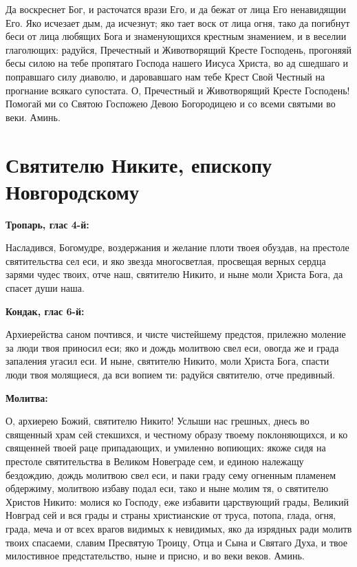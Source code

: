 Да воскреснет Бог, и расточатся врази Его, и да бежат от лица Его ненавидящии Его. Яко исчезает дым, да исчезнут; яко тает воск от лица огня, тако да погибнут беси от лица любящих Бога и знаменующихся крестным знамением, и в веселии глаголющих: радуйся, Пречестный и Животворящий Кресте Господень, прогоняяй бесы силою на тебе пропятаго Господа нашего Иисуса Христа, во ад сшедшаго и поправшаго силу диаволю, и даровавшаго нам тебе Крест Свой Честный на прогнание всякаго супостата. О, Пречестный и Животворящий Кресте Господень! Помогай ми со Святою Госпожею Девою Богородицею и со всеми святыми во веки. Аминь.
\mychapterending


 

\section{Святителю Никите, епископу Новгородскому}
 


\bfseries Тропарь, глас 4-й:\normalfont{}\nopagebreak


Насладився, Богомудре, воздержания и желание плоти твоея обуздав, на престоле святительства сел еси, и яко звезда многосветлая, просвещая верных сердца зарями чудес твоих, отче наш, святителю Никито, и ныне моли Христа Бога, да спасет души наша.


\medskip


\bfseries Кондак, глас 6-й:\normalfont{}\nopagebreak


Архиерейства саном почтився, и чисте чистейшему предстоя, прилежно моление за люди твоя приносил еси; яко и дождь молитвою свел еси, овогда же и града запаления угасил еси. И ныне, святителю Никито, моли Христа Бога, спасти люди твоя молящиеся, да вси вопием ти: радуйся святителю, отче предивный.


\medskip


\bfseries Молитва:\normalfont{}\nopagebreak


О, архиерею Божий, святителю Никито! Услыши нас грешных, днесь во священный храм сей стекшихся, и честному образу твоему поклоняющихся, и ко священней твоей раце припадающих, и умиленно вопиющих: якоже сидя на престоле святительства в Великом Новеграде сем, и единою належащу бездождию, дождь молитвою свел еси, и паки граду сему огненным пламенем обдержиму, молитвою избаву подал еси, тако и ныне молим тя, о святителю Христов Никито: молися ко Господу, еже избавити царствующий грады, Великий Новград сей и вся грады и страны христианские от труса, потопа, глада, огня, града, меча и от всех врагов видимых к невидимых, яко да изрядных ради молитв твоих спасаеми, славим Пресвятую Троицу, Отца и Сына и Святаго Духа, и твое милостивное предстательство, ныне и присно, и во веки веков. Аминь.


